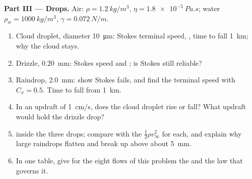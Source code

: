 \begin{problem}
\medskip
\noindent\textbf{Part III --- Drops.}
Air: $\rho = \qty{1.2}{kg/m^3}$, $\eta = \qty{1.8e-5}{Pa.s}$; water $\rho_w =
\qty{1000}{kg/m^3}$, $\gamma = \qty{0.072}{N/m}$.
\begin{enumerate}[resume]
  \item Cloud droplet, diameter \qty{10}{\micro m}: Stokes terminal speed,
        , time to fall \qty{1}{km}; why the cloud stays.
  \item Drizzle, \qty{0.20}{mm}: Stokes speed and ; is
        Stokes still reliable?
  \item Raindrop, \qty{2.0}{mm}: show Stokes fails, and find the terminal
        speed with $C_x = 0.5$. Time to fall from \qty{1}{km}.
  \item In an updraft of \qty{1}{cm/s}, does the cloud droplet rise or
        fall? What updraft would hold the drizzle drop?
  \item {} inside the three drops; compare with the
         $\tfrac12\rho v_\infty^2$ for each, and explain why
        large raindrops flatten and break up above about \qty{5}{mm}.
  \item In one table, give for the eight flows of this problem the
         and the law that governs it.
\end{enumerate}
\end{problem}
